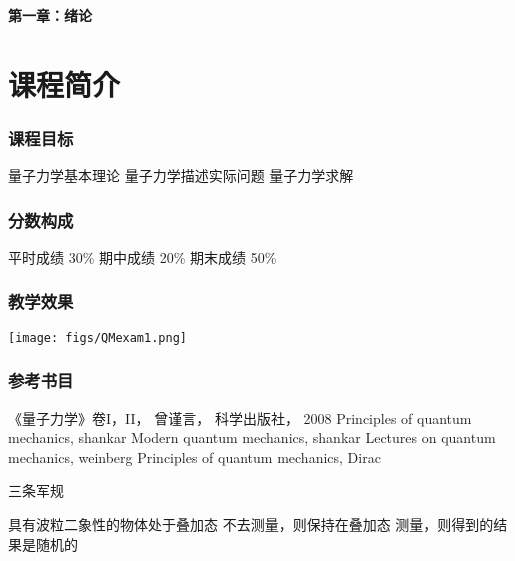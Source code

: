 \begin{frame} [plain]
    \frametitle{}
    \begin{center}
    { {\bf \huge 第一章：绪论 }}
    \end{center}  
    \addtocounter{framenumber}{-1}   
\end{frame}

\section{课程简介}

\begin{frame}
    \frametitle{课程目标}
        \begin{enumerate}
            \Item 量子力学基本理论
            \Item 量子力学描述实际问题
            \Item 量子力学求解
        \end{enumerate}
\end{frame}
\begin{frame} 
    \frametitle{分数构成}
        \begin{enumerate}
            \Item 平时成绩 30\%
            \Item 期中成绩 20\%
            \Item 期末成绩 50\%
        \end{enumerate}
\end{frame}

\begin{frame} 
    \frametitle{教学效果}
    \centering
    \texttt{[image: figs/QMexam1.png]}
\end{frame}

\begin{frame}
    \frametitle{参考书目}
        \begin{itemize}
            \Item 《量子力学》卷I，II， 曾谨言， 科学出版社， 2008           
            \Item Principles of quantum mechanics, shankar
            \Item Modern quantum mechanics, shankar
            \Item Lectures on quantum mechanics, weinberg
            \Item Principles of quantum mechanics, Dirac
        \end{itemize}
\end{frame}

\begin{frame}
    \begin{atcbox}{三条军规}
        \begin{enumerate}
            \Item 具有波粒二象性的物体处于叠加态
            \Item 不去测量，则保持在叠加态
            \Item 测量，则得到的结果是随机的
        \end{enumerate}
    \end{atcbox}
\end{frame}

